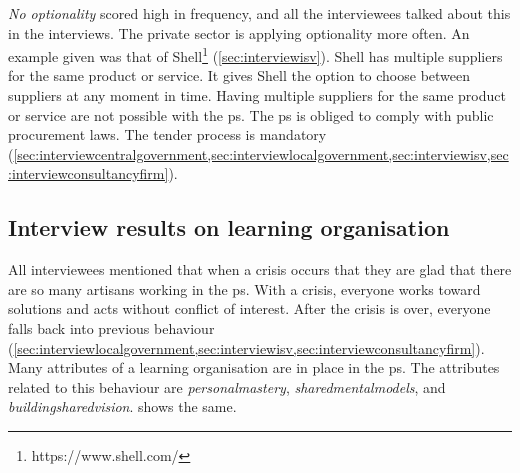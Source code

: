 \textit{No \gls{optionality}} scored high in frequency, and all the interviewees talked about this in the interviews. The private sector is applying optionality more often. An example given was that of Shell\footnote{https://www.shell.com/} (\cref{sec:interviewisv}). Shell has multiple suppliers for the same product or service. It gives Shell the option to choose between suppliers at any moment in time. Having multiple suppliers for the same product or service are not possible with the \gls{ps}. The \gls{ps} is obliged to comply with public procurement laws. The tender process is mandatory (\cref{sec:interviewcentralgovernment,sec:interviewlocalgovernment,sec:interviewisv,sec:interviewconsultancyfirm}).
\subsection{Interview results on learning organisation}
\label{sub:interviewresultslearning}
All interviewees mentioned that when a crisis occurs that they are glad that there are so many artisans working in the \gls{ps}. With a crisis, everyone works toward solutions and acts without conflict of interest. After the crisis is over, everyone falls back into previous behaviour (\cref{sec:interviewlocalgovernment,sec:interviewisv,sec:interviewconsultancyfirm}). Many \glspl{attribute} of a learning organisation are in place in the \gls{ps}. The \glspl{attribute} related to this behaviour are \textit{\gls{personalmastery}}, \textit{\glspl{sharedmentalmodel}}, and \textit{\gls{buildingsharedvision}}.  shows the same.

